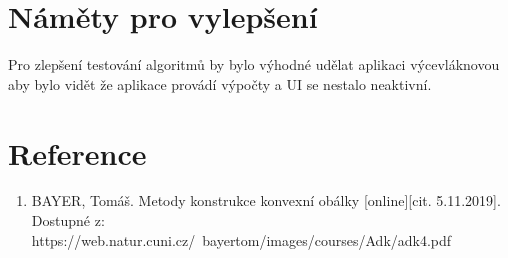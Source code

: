 \documentclass[a4paper, 12pt]{article}
\begin{document}
\section{Náměty pro vylepšení} 
Pro zlepšení testování algoritmů by bylo výhodné udělat aplikaci výcevláknovou aby bylo vidět že aplikace provádí výpočty a UI se nestalo neaktivní.

\section{Reference}

\begin{enumerate}

\item  BAYER, Tomáš. Metody konstrukce konvexní obálky [online][cit. 5.11.2019]. \\
Dostupné z: https://web.natur.cuni.cz/~bayertom/images/courses/Adk/adk4.pdf  \\

\end{enumerate}
\end{document}

